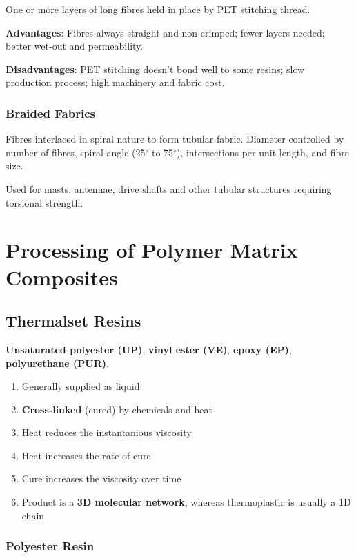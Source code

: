 \documentclass{NoteThesis/note-thesis}
\begin{document}
One or more layers of long fibres held in place by PET stitching thread.

\textbf{Advantages}: Fibres always straight and non-crimped; fewer layers needed; better wet-out and permeability.

\textbf{Disadvantages}: PET stitching doesn't bond well to some resins; slow production process; high machinery and fabric cost.

\subsubsection*{Braided Fabrics}

Fibres interlaced in spiral nature to form tubular fabric. Diameter controlled by number of fibres, spiral angle (25$^\circ$ to 75$^\circ$), intersections per unit length, and fibre size.

Used for masts, antennae, drive shafts and other tubular structures requiring torsional strength.

\section{Processing of Polymer Matrix Composites}


\subsection{Thermalset Resins}

\textbf{Unsaturated polyester (UP)}, \textbf{vinyl ester (VE)}, \textbf{epoxy (EP)}, \textbf{polyurethane (PUR)}.

\begin{enumerate}
    \item Generally supplied as liquid
    \item \textbf{Cross-linked} (cured) by chemicals and heat
    \item Heat reduces the instantanious viscosity
    \item Heat increases the rate of cure
    \item Cure increases the viscosity over time
    \item Product is a \textbf{3D molecular network}, whereas thermoplastic is usually a 1D chain
\end{enumerate}


\subsubsection*{Polyester Resin}
\end{document}
